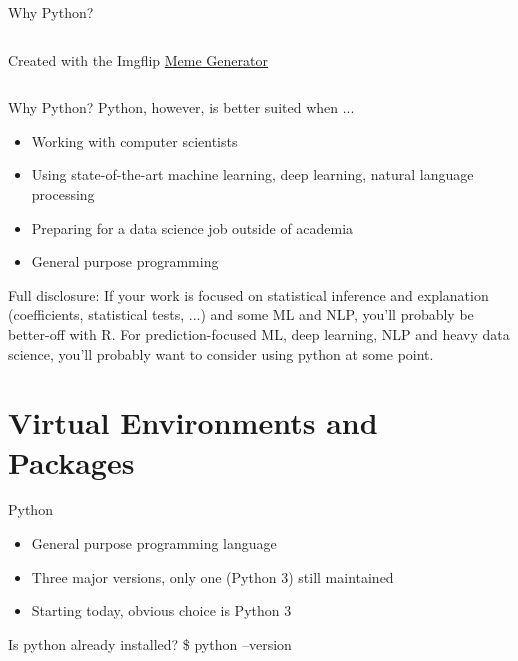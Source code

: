 \documentclass[10pt, aspectratio=169]{beamer}
\newcommand{\cemph}[1]{\textcolor{mzescyan}{#1}}
\begin{document}
{\begin{frame}{Why Python?}
\begin{columns}
\begin{column}{0.5\textwidth}
\begin{center}
            \tiny{Created with the Imgflip \href{https://imgflip.com/memegenerator}{Meme Generator}}
     \end{center}
\end{column}
\end{columns}
  \end{frame}

	\begin{frame}{Why Python?}
	\small
	\cemph{Python, however, is better suited when ...}
            \begin{itemize}
                \item Working with computer scientists
                \item Using state-of-the-art machine learning, deep learning, natural language processing
                \item Preparing for a data science job outside of academia
                \item General purpose programming
            \end{itemize}
    \small
	Full disclosure: If your work is focused on statistical inference and explanation (coefficients, statistical tests, ...) and some ML and NLP, you'll probably be better-off with R. For prediction-focused ML, deep learning, NLP and heavy data science, you'll probably want to consider using python at some point.
  \end{frame}


\section{Virtual Environments and Packages}
	
	\begin{frame}{Python}
	\small
            \begin{itemize}
                \item General purpose programming language
                \item Three major versions, only one (Python 3) still maintained
                \item Starting today, obvious choice is Python 3
            \end{itemize}
   		\begin{block}{Is python already installed?}
			\$ python --version
		\end{block}       
  \end{frame}

}
\end{document}
